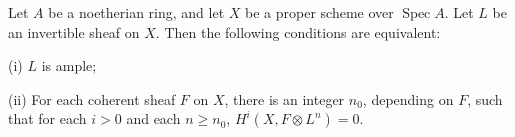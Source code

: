 Let $A$ be a noetherian ring, and let $X$ be a proper scheme over $\operatorname{Spec} A$. Let $L$ be an invertible sheaf on $X$. Then the following conditions are equivalent:

(i) $L$ is ample;

(ii) For each coherent sheaf $F$ on $X$, there is an integer $n_0$, depending on $F$, such that for each $i > 0$ and each $n \geq n_0$, $H^i(X, F \otimes L^n) = 0$.
